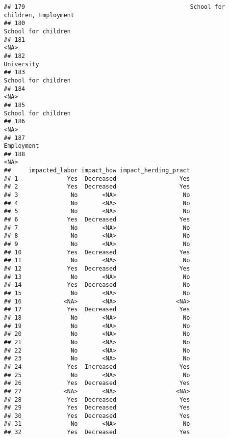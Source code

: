\documentclass[
]{article}
\begin{document}
\begin{verbatim}
## 179                                               School for children, Employment
## 180                                                           School for children
## 181                                                                          <NA>
## 182                                                                    University
## 183                                                           School for children
## 184                                                                          <NA>
## 185                                                           School for children
## 186                                                                          <NA>
## 187                                                                    Employment
## 188                                                                          <NA>
##     impacted_labor impact_how impact_herding_pract
## 1              Yes  Decreased                  Yes
## 2              Yes  Decreased                  Yes
## 3               No       <NA>                   No
## 4               No       <NA>                   No
## 5               No       <NA>                   No
## 6              Yes  Decreased                  Yes
## 7               No       <NA>                   No
## 8               No       <NA>                   No
## 9               No       <NA>                   No
## 10             Yes  Decreased                  Yes
## 11              No       <NA>                   No
## 12             Yes  Decreased                  Yes
## 13              No       <NA>                   No
## 14             Yes  Decreased                   No
## 15              No       <NA>                   No
## 16            <NA>       <NA>                 <NA>
## 17             Yes  Decreased                  Yes
## 18              No       <NA>                   No
## 19              No       <NA>                   No
## 20              No       <NA>                   No
## 21              No       <NA>                   No
## 22              No       <NA>                   No
## 23              No       <NA>                   No
## 24             Yes  Increased                  Yes
## 25              No       <NA>                   No
## 26             Yes  Decreased                  Yes
## 27            <NA>       <NA>                 <NA>
## 28             Yes  Decreased                  Yes
## 29             Yes  Decreased                  Yes
## 30             Yes  Decreased                  Yes
## 31              No       <NA>                   No
## 32             Yes  Decreased                  Yes

\end{verbatim}
\end{document}
